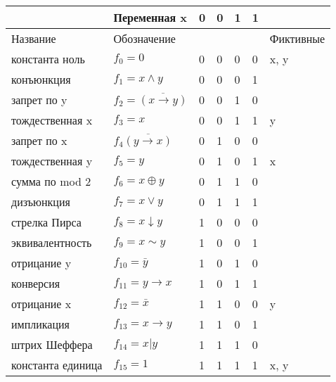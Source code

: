 \documentclass{article}
\begin{document}
	\begin{table}[ht]
		\begin{tabular}{|l|l|l|l|l|l|l|}
			\hline
			\rowcolor[HTML]{B0B2D9} 
			& Переменная x                         & 0 & 0 & 1 & 1 &           \\ \hline
			\rowcolor[HTML]{A9CAB3} 
			Название          & Обозначение                          &   &   &   &   & Фиктивные \\ \hline
			\rowcolor[HTML]{C8A5B5} 
			константа ноль    & $f_0 = 0$                            & 0 & 0 & 0 & 0 & x, y      \\ \hline
			\rowcolor[HTML]{C8A5B5} 
			конъюнкция        & $f_1 = x \wedge y$                   & 0 & 0 & 0 & 1 &           \\ \hline
			\rowcolor[HTML]{C8A5B5} 
			запрет по y       & $f_2 = \overline{(x \rightarrow y)}$ & 0 & 0 & 1 & 0 &           \\ \hline
			\rowcolor[HTML]{C8A5B5} 
			тождественная x   & $f_3 = x$                            & 0 & 0 & 1 & 1 & y         \\ \hline
			\rowcolor[HTML]{CAA788} 
			запрет по x       & $f_4 \overline{(y \rightarrow x)}$   & 0 & 1 & 0 & 0 &           \\ \hline
			\rowcolor[HTML]{CAA788} 
			тождественная y   & $f_5 = y$                            & 0 & 1 & 0 & 1 & x         \\ \hline
			\rowcolor[HTML]{CAA788} 
			сумма по mod 2    & $f_6 = x \oplus y$                   & 0 & 1 & 1 & 0 &           \\ \hline
			\rowcolor[HTML]{CAA788} 
			дизъюнкция        & $f_7 = x \vee y$                     & 0 & 1 & 1 & 1 &           \\ \hline
			\rowcolor[HTML]{9DCBAB} 
			стрелка Пирса     & $f_8 = x \downarrow y$               & 1 & 0 & 0 & 0 &           \\ \hline
			\rowcolor[HTML]{9DCBAB} 
			эквивалентность   & $f_9 = x \sim y$                     & 1 & 0 & 0 & 1 &           \\ \hline
			\rowcolor[HTML]{9DCBAB} 
			отрицание y       & $f_{10} = \bar{y}$                   & 1 & 0 & 1 & 0 &           \\ \hline
			\rowcolor[HTML]{9DCBAB} 
			конверсия         & $f_{11} = y \rightarrow x$           & 1 & 0 & 1 & 1 &           \\ \hline
			\rowcolor[HTML]{B9B0D0} 
			отрицание x       & $f_{12} = \bar{x}$                   & 1 & 1 & 0 & 0 & y         \\ \hline
			\rowcolor[HTML]{B9B0D0} 
			импликация        & $f_{13} = x \rightarrow y$           & 1 & 1 & 0 & 1 &           \\ \hline
			\rowcolor[HTML]{B9B0D0} 
			штрих Шеффера     & $f_{14} = x | y$                     & 1 & 1 & 1 & 0 &           \\ \hline
			\rowcolor[HTML]{B9B0D0} 
			константа единица & $f_{15} = 1$                         & 1 & 1 & 1 & 1 & x, y      \\ \hline
		\end{tabular}
	\end{table}
	
\end{document}
